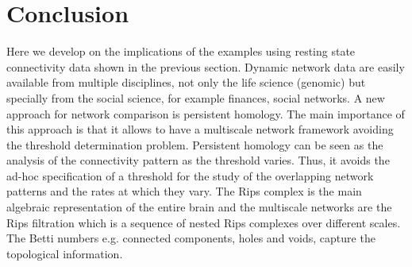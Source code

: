 \documentclass[onecollarge,runningheads]{svjour2}
\begin{document}
\section{Conclusion}
\label{se:conclusion}
Here we develop on the implications of the examples using resting state connectivity data shown in the previous section.
Dynamic network data are easily available from multiple disciplines, not only the life science (genomic) but specially from the social science, for example finances, social networks. A new approach for network comparison is persistent homology. The main importance of this approach is that it allows to have a multiscale network framework avoiding the threshold determination problem. Persistent homology can be seen as the analysis of the connectivity pattern as the threshold varies. Thus, it avoids the ad-hoc specification of a threshold for the study of the overlapping network patterns and the rates at which they vary.
The Rips complex is the main algebraic representation of the entire brain and the multiscale networks are the Rips filtration which is a sequence of nested Rips complexes over different scales. The Betti numbers e.g. connected components, holes and voids, capture the topological information. 
\end{document}
